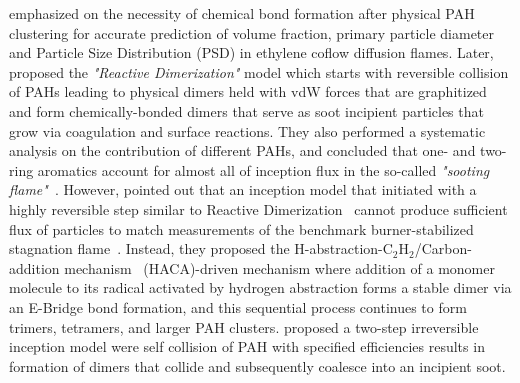 





\citet{kholghy2019role} emphasized on the necessity of chemical bond formation after physical PAH clustering for accurate prediction of volume fraction, primary particle diameter and Particle Size Distribution (PSD) in ethylene coflow diffusion flames. Later, \citet{kholghy2018reactive} proposed the \textit{"Reactive Dimerization"} model which starts with reversible collision of PAHs leading to physical dimers held with vdW forces that are graphitized and form chemically-bonded dimers that serve as soot incipient particles that grow via  coagulation and surface reactions. They also performed a systematic analysis on the contribution of different PAHs, and concluded that one- and two-ring aromatics account for almost all of inception flux in the so-called \textit{"sooting flame"}~\citep{desgroux2017comparative}. However, \citet{frenklach2020mechanism} pointed out that an inception model that initiated with a highly reversible step similar to Reactive Dimerization~\citep{kholghy2018reactive} cannot produce sufficient flux of particles to match measurements of the benchmark burner-stabilized stagnation flame~\citep{abid2009quantitative}. Instead, they proposed the H-abstraction-$\mathrm{C_2H_2}$/Carbon-addition  mechanism~\citep{frenklach1991detailed, appel2000kinetic} (HACA)-driven mechanism where addition of a monomer molecule to its radical activated by hydrogen abstraction forms a stable dimer via an E-Bridge bond formation, and this sequential process continues to form trimers, tetramers, and larger PAH clusters. \citet{blanquart2009joint} proposed a two-step irreversible inception model were self collision of PAH with specified efficiencies results in formation of dimers that collide and subsequently coalesce into an incipient soot.

